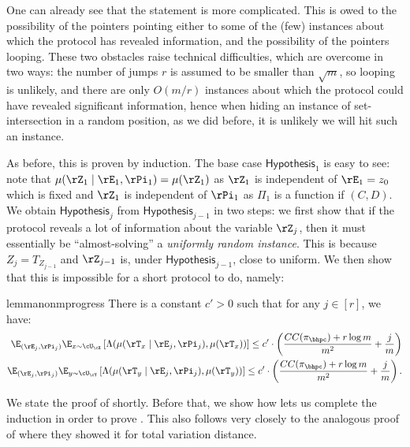 One can already see that the statement is more complicated. This is owed to the possibility of the pointers pointing either to some of the (few) instances about which the protocol has revealed information, and the possibility of the pointers looping. These two obstacles raise technical difficulties, which are overcome in two ways: the number of jumps $r$ is assumed to be smaller than $\sqrt m$, so looping is unlikely, and there are only $O(m/r)$ instances about which the protocol could have revealed significant information, hence when hiding an instance of set-intersection in a random position, as we did before, it is unlikely we will hit such an instance.

As before, this is proven by induction. The base case $\mathsf{Hypothesis}_1$ is easy to see: note that $\mu(\rZ_1 \mid \rE_1, \rPi_1) = \mu(\rZ_1)$ as $\rZ_1$ is independent of $\rE_1 = z_0$ which is fixed and $\rZ_1$ is independent of $\rPi_1$ as $\Pi_1$ is a function if $(C,D)$. We obtain
$\mathsf{Hypothesis}_j$ from $\mathsf{Hypothesis}_{j-1}$ in two steps: we first show that if the protocol reveals a lot of information about the variable $\rZ_{j}$, then it must essentially be ``almost-solving'' a \textit{uniformly random instance}. This is because $Z_{j} = T_{Z_{j-1}}$ and $\rZ_{j-1}$ is, under $\mathsf{Hypothesis}_{j-1}$, close to uniform. We then show that this is impossible for a short protocol to do, namely: 

\begin{restatable}%
{lemma}{nonmprogress} \label{lem:nonmprogress}
There is a constant $c' > 0$ such that for any $j \in [r]$, we have:
\begin{align*}
\E_{(\rE_j, \rPi_j)}\E_{x \sim \cU_\cX}\left[\Lambda(\mu(\rT_x \mid \rE_j, \rPi_j), \mu(\rT_x))\right] \leq  c' \cdot \left( \frac{CC(\pi_\bhpc)+r\log m}{m^2} + \frac{j} m\right)\\
\E_{(\rE_j, \rPi_j)}\E_{y \sim \cU_\cY}\left[\Lambda(\mu(\rT_y \mid \rE_j, \rPi_j), \mu(\rT_y))\right] \leq c' \cdot \left( \frac{CC(\pi_\bhpc)+r\log m}{m^2} + \frac{j} m\right).
\end{align*}
\end{restatable}

We state the proof of  shortly. Before that, we show how  lets us complete the induction in order to prove . This also follows very closely to the analogous proof of \cite{AssadiCK19} where they showed it for total variation distance.

